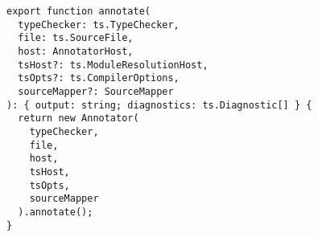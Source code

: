 \begin{verbatim}
export function annotate(
  typeChecker: ts.TypeChecker,
  file: ts.SourceFile,
  host: AnnotatorHost,
  tsHost?: ts.ModuleResolutionHost,
  tsOpts?: ts.CompilerOptions,
  sourceMapper?: SourceMapper
): { output: string; diagnostics: ts.Diagnostic[] } {
  return new Annotator(
    typeChecker,
    file,
    host,
    tsHost,
    tsOpts,
    sourceMapper
  ).annotate();
}
\end{verbatim}

